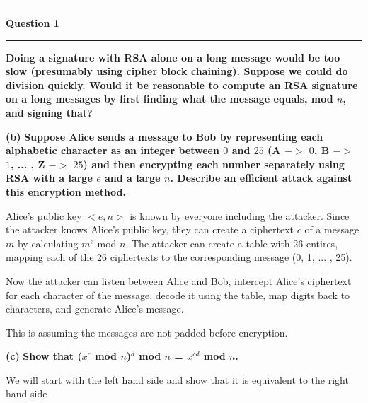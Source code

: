 \documentclass[11pt]{article}
\newcommand\question[2]{\vspace{.25in}\hrule\textbf{#1}\vspace{.5em}\hrule\vspace{.10in}}
\renewcommand\part[1]{\vspace{.10in}\textbf{(#1)}}
\begin{document}
\raggedright
\newcommand\NAME{Jake Pitkin}  %
\newcommand\UID{u0891770}     %
\newcommand\HWNUM{3}              %

\question{Question 1}

\part{a} \textbf{Doing a signature with RSA alone on a long message would be too slow (presumably using cipher block chaining). Suppose we could do division quickly. Would it be reasonable to compute an RSA signature on a long messages by first finding what the message equals, mod $n$, and signing that?}



\part{b} \textbf{Suppose Alice sends a message to Bob by representing each alphabetic character as an integer between $0$ and $25$ (A $->$ $0$, B $->$ $1$, ... , Z $->$ $25$) and then encrypting each number separately using RSA with a large $e$ and a large $n$. Describe an efficient attack against this encryption method.}

Alice's public key ${<}e, n{>}$ is known by everyone including the attacker. Since the attacker knows Alice's public key, they can create a ciphertext $c$ of a message $m$ by calculating $m^e$ mod $n$. The attacker can create a table with 26 entires, mapping each of the 26 ciphertexts to the corresponding message (0, 1, ... , 25). 

Now the attacker can listen between Alice and Bob, intercept Alice's ciphertext for each character of the message, decode it using the table, map digits back to characters, and generate Alice's message.

This is assuming the messages are not padded before encryption.

\part{c} \textbf{Show that ($x^c$ mod $n$)$^d$ mod $n$ = $x^{cd}$ mod $n$.}

We will start with the left hand side and show that it is equivalent to the right hand side
\end{document}
